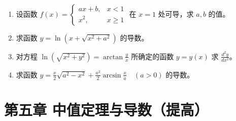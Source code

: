 \documentclass[12pt, a4paper]{article}
\begin{document}
\begin{enumerate}
    \item 设函数 $ f(x)=\begin{cases}ax+b, & x<1\\ x^{2}, & x\geq1\end{cases} $ 在 $x=1$ 处可导，求 $a,b$ 的值。

    \item 求函数 $ y = \ln(x + \sqrt{x^{2} + a^{2}}) $ 的导数。

    \item 对方程 $ \ln(\sqrt{x^{2}+y^{2}})=\arctan\frac{y}{x} $ 所确定的函数 $ y=y(x) $ 求 $ \frac{d^{2}y}{dx^{2}} $。

    \item 求函数 $ y = \frac{x}{2} \sqrt{a^{2} - x^{2}} + \frac{a^{2}}{2} \arcsin \frac{x}{a} \quad (a > 0) $ 的导数。
\end{enumerate}

\section*{第五章 中值定理与导数（提高）}
\end{document}
